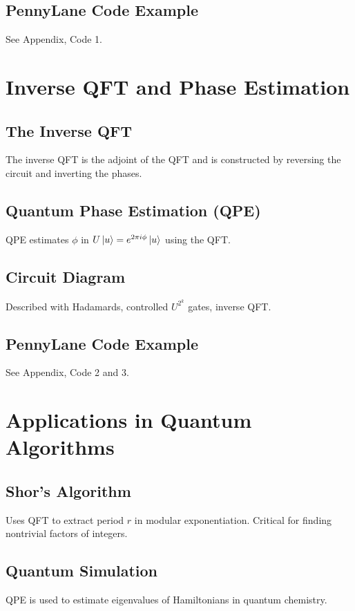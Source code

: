 \documentclass[12pt]{book}
\begin{document}
\section{PennyLane Code Example}
See Appendix, Code 1.

\chapter{Inverse QFT and Phase Estimation}

\section{The Inverse QFT}
The inverse QFT is the adjoint of the QFT and is constructed by reversing the circuit and inverting the phases.

\section{Quantum Phase Estimation (QPE)}
QPE estimates $\phi$ in $U \ket{u} = e^{2\pi i \phi} \ket{u}$ using the QFT.

\section{Circuit Diagram}
Described with Hadamards, controlled $U^{2^k}$ gates, inverse QFT.

\section{PennyLane Code Example}
See Appendix, Code 2 and 3.

\chapter{Applications in Quantum Algorithms}

\section{Shor’s Algorithm}
Uses QFT to extract period $r$ in modular exponentiation. Critical for finding nontrivial factors of integers.

\section{Quantum Simulation}
QPE is used to estimate eigenvalues of Hamiltonians in quantum chemistry.
\end{document}

